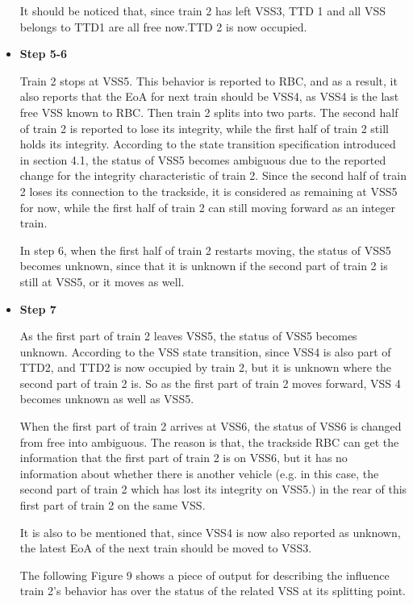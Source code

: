 \documentclass[article,dr=phil,type=drfinal,colorback,accentcolor=tud9c]{tudthesis}
\begin{document}
\begin{itemize}
    It should be noticed that, since train 2 has left VSS3, TTD 1 and all VSS belongs to TTD1 are all free now.TTD 2 is now occupied.

    \item \textbf{Step 5-6}

    Train 2 stops at VSS5. This behavior is reported to RBC, and as a result, it also reports that the EoA for next train should be VSS4, as VSS4 is the last free VSS known to RBC. Then train 2 splits into two parts. The second half of train 2 is reported to lose its integrity, while the first half of train 2 still holds its integrity. According to the state transition specification introduced in section 4.1, the status of VSS5 becomes ambiguous due to the reported change for the integrity characteristic of train 2. Since the second half of train 2 loses its connection to the trackside, it is considered as remaining at VSS5 for now, while the first half of train 2 can still moving forward as an integer train.
    
    In step 6, when the first half of train 2 restarts moving, the status of VSS5 becomes unknown, since that it is unknown if the second part of train 2 is still at VSS5, or it moves as well. 
    
	\item \textbf{Step 7}
	
    As the first part of train 2 leaves VSS5, the status of VSS5 becomes unknown. According to the VSS state transition, since VSS4 is also part of TTD2, and TTD2 is now occupied by train 2, but it is unknown where the second part of train 2 is. So as the first part of train 2 moves forward, VSS 4 becomes unknown as well as VSS5. 
    
    When the first part of train 2 arrives at VSS6, the status of VSS6 is changed from free into ambiguous. The reason is that, the trackside RBC can get the information that the first part of train 2 is on VSS6, but it has no information about whether there is another vehicle (e.g. in this case, the second part of train 2 which has lost its integrity on VSS5.) in the rear of this first part of train 2 on the same VSS.
    
    It is also to be mentioned that, since VSS4 is now also reported as unknown, the latest EoA of the next train should be moved to VSS3.
    

    The following Figure 9 shows a piece of output for describing the influence train 2's behavior has over the status of the related VSS at its splitting point.
	

\end{itemize}
\end{document}

